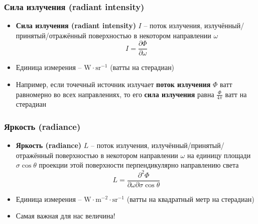 \documentclass[handout,10pt]{beamer}
\begin{document}
\begin{frame}
\frametitle{Сила излучения (radiant intensity)}
\begin{itemize}
\item \textbf{Сила излучения (radiant intensity)} \begin{math}I\end{math} -- поток излучения, излучённый/принятый/отражённый поверхностью в некотором направлении \begin{math}\omega\end{math}
\begin{equation*}
I = \frac{\partial \Phi}{\partial \omega}
\end{equation*}
\pause
\item Единица измерения -- \begin{math}\text{W}\cdot \text{sr}^{-1}\end{math} (ватты на стерадиан)
\pause
\item Например, если точечный источник излучает \textbf{поток излучения} \begin{math}\Phi\end{math} ватт равномерно во всех направлениях, то его \textbf{сила излучения} равна \begin{math}\frac{\Phi}{4\pi}\end{math} ватт на стерадиан
\end{itemize}
\end{frame}

\begin{frame}
\frametitle{Яркость (radiance)}
\begin{itemize}
\item \textbf{Яркость (radiance)} \begin{math}L\end{math} -- поток излучения, излучённый/принятый/отражённый поверхностью в некотором направлении \begin{math}\omega\end{math} на единицу площади \begin{math}\sigma\cos\theta\end{math} проекции этой поверхности перпендикулярно направлению света
\begin{equation*}
L = \frac{\partial^2 \Phi}{\partial \omega \partial \sigma \cos \theta}
\end{equation*}
\pause
\item Единица измерения -- \begin{math}\text{W}\cdot \text{m}^{-2} \cdot \text{sr}^{-1}\end{math} (ватты на квадратный метр на стерадиан)
\pause
\item Самая важная для нас величина!
\end{itemize}
\end{frame}
\end{document}
